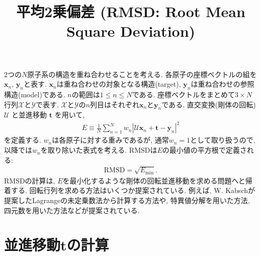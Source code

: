 





\title{平均2乗偏差 (RMSD: Root Mean Square Deviation)}
\maketitle

2つの$N$原子系の構造を重ね合わせることを考える.
各原子の座標ベクトルの組を$\mathbf{x}_{n}$, $\mathbf{y}_{n}$と表す.
$\mathbf{x}_{n}$は重ね合わせの対象となる構造(target), $\mathbf{y}_{n}$は重ね合わせの参照構造(model)である.
$n$の範囲は$1 \le n \le N$である. 
座標ベクトルをまとめて$3 \times N$行列$\mathcal{X}$と$\mathcal{Y}$で表す.
$\mathcal{X}$と$\mathcal{Y}$の$n$列目はそれぞれ$\mathbf{x}_{n}$と$\mathbf{y}_{n}$である.
直交変換(剛体の回転) $\mathcal{U}$ と並進移動 $\mathbf{t}$ を用いて,
\begin{align}
 E 
 \equiv
 \frac{1}{N} \sum_{n=1}^{N} w_{n} |\mathcal{U}\mathbf{x}_{n} + \mathbf{t} - \mathbf{y}_{n}|^{2}
 \label{eq:E}
\end{align}
を定義する.
$w_{n}$は各原子に対する重みであるが, 通常$w_{n}=1$として取り扱うので, 以降では$w_{n}$を取り除いた表式を考える.
RMSDは$E$の最小値の平方根で定義される:
\begin{align}
 \mathrm{RMSD} = \sqrt{E_{\mathrm{min}}} .
\end{align}
RMSDの計算は, $E$を最小化するような剛体の回転並進移動を求める問題へと帰着する.
回転行列を求める方法はいくつか提案されている.
例えば, W. Kabschが提案したLagrangeの未定乗数法から計算する方法\cite{1976Kabsch, 1978Kabsch}や,
特異値分解を用いた方法\cite{2004Coutsias}, 四元数を用いた方法\cite{2004Coutsias, 2007Karney, 2019Coutsias}などが提案されている.


\section{並進移動$\mathbf{t}$の計算}

